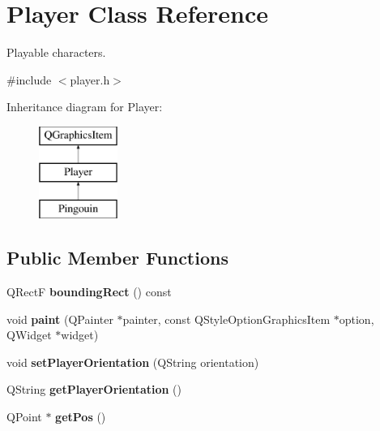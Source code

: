 \hypertarget{class_player}{}\section{Player Class Reference}
\label{class_player}


Playable characters.  




{\ttfamily \#include $<$player.\+h$>$}

Inheritance diagram for Player\+:\begin{figure}[H]
\begin{center}
\leavevmode
\includegraphics[height=3.000000cm]{class_player}
\end{center}
\end{figure}
\subsection*{Public Member Functions}
\begin{DoxyCompactItemize}
\item 
\hypertarget{class_player_a40e85189b099c86221a8ad62f3173980}{}Q\+Rect\+F {\bfseries bounding\+Rect} () const \label{class_player_a40e85189b099c86221a8ad62f3173980}

\item 
\hypertarget{class_player_a02d1d7a8488bc2ed3a9b317dcf17b39c}{}void {\bfseries paint} (Q\+Painter $\ast$painter, const Q\+Style\+Option\+Graphics\+Item $\ast$option, Q\+Widget $\ast$widget)\label{class_player_a02d1d7a8488bc2ed3a9b317dcf17b39c}

\item 
\hypertarget{class_player_a80ee830f8960d206559305a257e34dcb}{}void {\bfseries set\+Player\+Orientation} (Q\+String orientation)\label{class_player_a80ee830f8960d206559305a257e34dcb}

\item 
\hypertarget{class_player_a7c71ec72ae01aa19ffff508fe61df393}{}Q\+String {\bfseries get\+Player\+Orientation} ()\label{class_player_a7c71ec72ae01aa19ffff508fe61df393}

\item 
\hypertarget{class_player_aab3077d4bd36a08a88a618b56a115b1e}{}Q\+Point $\ast$ {\bfseries get\+Pos} ()\label{class_player_aab3077d4bd36a08a88a618b56a115b1e}

\end{DoxyCompactItemize}
